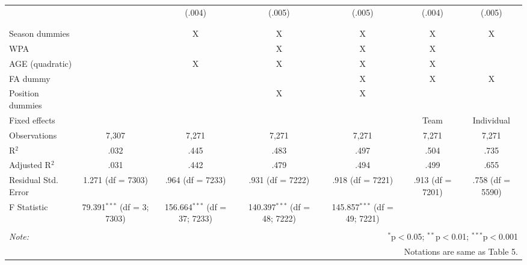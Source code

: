 \begin{table}[H]
\begin{tabular}{@{\extracolsep{5pt}}lcccccc}
  &  & (.004) & (.005) & (.005) & (.004) & (.005) \\
  & & & & & & \\
\hline \\[-1.8ex]
Season dummies &  & X & X & X & X & X \\
WPA & & & X & X & X &  \\
AGE (quadratic) &  & X & X & X & X &  \\
FA dummy &  &  &  & X & X & X \\
Position dummies &  &  & X & X &  &  \\
Fixed effects &  &  &  &  & Team & Individual \\
Observations & 7,307 & 7,271 & 7,271 & 7,271 & 7,271 & 7,271 \\
R$^{2}$ & .032 & .445 & .483 & .497 & .504 & .735 \\
Adjusted R$^{2}$ & .031 & .442 & .479 & .494 & .499 & .655 \\
Residual Std. Error & 1.271 (df = 7303) & .964 (df = 7233) & .931 (df = 7222) & .918 (df = 7221) & .913 (df = 7201) & .758 (df = 5590) \\
F Statistic & 79.391$^{***}$ (df = 3; 7303) & 156.664$^{***}$ (df = 37; 7233) & 140.397$^{***}$ (df = 48; 7222) & 145.857$^{***}$ (df = 49; 7221) &  &  \\
\hline
\hline \\[-1.8ex]
\textit{Note:}  & \multicolumn{6}{r}{$^{*}$p$<$0.05; $^{**}$p$<$0.01; $^{***}$p$<$0.001} \\
& \multicolumn{6}{r}{Notations are same as Table 5.} \\
\end{tabular}
\end{table}
